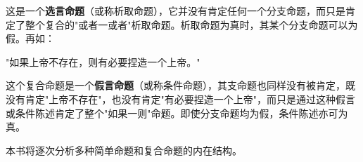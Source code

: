这是一个\textbf{选言命题}（或称析取命题），它并没有肯定任何一个分支命题，而只是肯定了整个复合的"或者一或者"析取命题。析取命题为真时，其某个分支命题可以为假。再如：

\begin{center}
"如果上帝不存在，则有必要捏造一个上帝。"\cite{voltaire1770}
\end{center}

这个复合命题是一个\textbf{假言命题}（或称条件命题），其支命题也同样没有被肯定，既没有肯定"上帝不存在"，也没有肯定"有必要捏造一个上帝"，而只是通过这种假言或条件陈述肯定了整个"如果一则"命题。即使分支命题均为假，条件陈述亦可为真。


本书将逐次分析多种简单命题和复合命题的内在结构。